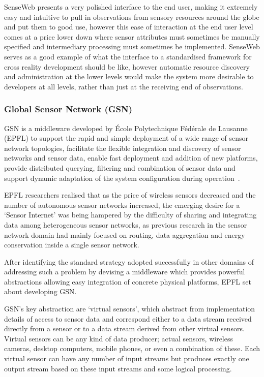 SenseWeb presents a very polished interface to the end user, making it extremely easy and intuitive to pull in observations from sensory resources around the globe and put them to good use, however this ease of interaction at the end user level comes at a price lower down where sensor attributes must sometimes be manually specified and intermediary processing must sometimes be implemented. SenseWeb serves as a good example of what the interface to a standardised framework for cross reality development should be like, however automatic resource discovery and administration at the lower levels would make the system more desirable to developers at all levels, rather than just at the receiving end of observations.

\subsubsection{Global Sensor Network (GSN)}
GSN is a middleware developed by \'{E}cole Polytechnique F\'{e}d\'{e}rale de Lausanne (EPFL) to support the rapid and simple deployment of a wide range of sensor network topologies, facilitate the flexible integration and discovery of sensor networks and sensor data, enable fast deployment and addition of new platforms, provide distributed querying, filtering and combination of sensor data and support dynamic adaptation of the system configuration during operation~\cite{Aberer2006}.

EPFL researchers realised that as the price of wireless sensors decreased and the number of autonomous sensor networks increased, the emerging desire for a `Sensor Internet' was being hampered by the difficulty of sharing and integrating data among heterogeneous sensor networks, as previous research in the sensor network domain had mainly focused on routing, data aggregation and energy conservation inside a single sensor network.

After identifying the standard strategy adopted successfully in other domains of addressing such a problem by devising a middleware which provides powerful abstractions allowing easy integration of concrete physical platforms, EPFL set about developing GSN.

GSN's key abstraction are `virtual sensors', which abstract from implementation details of access to sensor data and correspond either to a data stream received directly from a sensor or to a data stream derived from other virtual sensors. Virtual sensors can be any kind of data producer; actual sensors, wireless cameras, desktop computers, mobile phones, or even a combination of these. Each virtual sensor can have any number of input streams but produces exactly one output stream based on these input streams and some logical processing.

